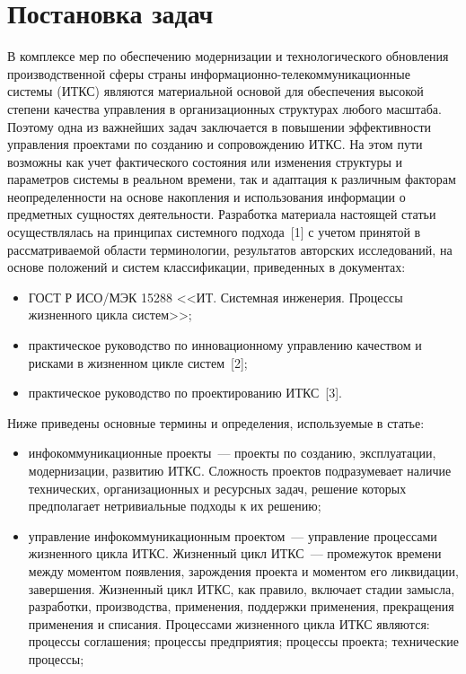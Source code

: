       \begin{multicols}{2}
      
            \label{st\stat}

\section{Постановка задач}

     В комплексе мер по обеспечению модернизации и технологического обновления 
производственной сферы страны 
     ин\-фор\-ма\-ци\-он\-но-те\-ле\-ком\-му\-ни\-ка\-ци\-он\-ные сис\-те\-мы (ИТКС) 
являются материальной основой для обеспечения высокой степени качества управ\-ле\-ния в 
организационных структурах любого масштаба. Поэтому одна из важнейших задач 
заключается в повышении эффективности управ\-ле\-ния проектами по созданию и 
сопровождению ИТКС. На этом пути возможны как учет фактического состояния или 
изменения структуры и параметров сис\-те\-мы в реальном времени, так и адаптация к 
различным факторам неопределенности на основе накопления и использования 
информации о предметных сущностях деятельности. Разработка материала настоящей 
статьи осуществлялась на принципах сис\-тем\-но\-го подхода~[1] с учетом принятой в 
рассматриваемой области терминологии, результатов авторских исследований, на основе 
положений и сис\-тем классификации, приведенных в документах:
     \begin{itemize}
\item ГОСТ Р ИСО/МЭК 15288 <<ИТ. Системная инженерия. Процессы жизненного цикла 
сис\-тем>>;
\item практическое руководство по инновационному управлению качеством и рисками в 
жизненном цикле сис\-тем~[2];
\item практическое руководство по проектированию ИТКС~[3].
\end{itemize}

     Ниже приведены основные термины и определения, используемые в статье:
     \begin{itemize}
\item инфокоммуникационные проекты~--- проекты по созданию, эксплуатации, 
модернизации, развитию ИТКС. Сложность проектов подразумевает наличие 
технических, организационных и ресурсных задач, решение которых предполагает 
нетривиальные подходы к их решению;
\item управление инфокоммуникационным проектом~--- управление процессами 
жизненного цик\-ла ИТКС. Жизненный цикл ИТКС~--- промежуток времени между 
моментом появления, зарождения проекта и моментом его ликвидации, завершения. 
Жизненный цикл ИТКС, как правило, включает стадии замысла, разработки, 
производства, применения, поддержки применения, прекращения применения и списания. 
Процессами жизненного цикла ИТКС являются: процессы соглашения; процессы 
предприятия; процессы проекта; технические про\-цессы;
{

}
\end{itemize}
\end{multicols}
